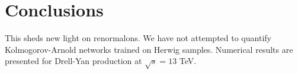 \section{Conclusions}\label{sec:conclusions}

This sheds new light on renormalons. We have not attempted to quantify
Kolmogorov-Arnold networks trained on Herwig samples. Numerical results
are presented for Drell-Yan production at $\sqrt{s} = 13$ TeV.

